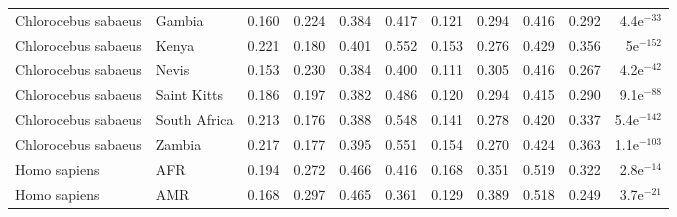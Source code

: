 \begin{longtable}{llrrrrrrrrr}
 Chlorocebus sabaeus &                    Gambia &                              0.160 &                               0.224 &                 0.384 &                 0.417 &                              0.121 &                               0.294 &                 0.416 &                 0.292 &  4.4e$^{-33}$ \\
 Chlorocebus sabaeus &                     Kenya &                              0.221 &                               0.180 &                 0.401 &                 0.552 &                              0.153 &                               0.276 &                 0.429 &                 0.356 &   5e$^{-152}$ \\
 Chlorocebus sabaeus &                     Nevis &                              0.153 &                               0.230 &                 0.384 &                 0.400 &                              0.111 &                               0.305 &                 0.416 &                 0.267 &  4.2e$^{-42}$ \\
 Chlorocebus sabaeus &               Saint Kitts &                              0.186 &                               0.197 &                 0.382 &                 0.486 &                              0.120 &                               0.294 &                 0.415 &                 0.290 &  9.1e$^{-88}$ \\
 Chlorocebus sabaeus &              South Africa &                              0.213 &                               0.176 &                 0.388 &                 0.548 &                              0.141 &                               0.278 &                 0.420 &                 0.337 & 5.4e$^{-142}$ \\
 Chlorocebus sabaeus &                    Zambia &                              0.217 &                               0.177 &                 0.395 &                 0.551 &                              0.154 &                               0.270 &                 0.424 &                 0.363 & 1.1e$^{-103}$ \\
        Homo sapiens &                       AFR &                              0.194 &                               0.272 &                 0.466 &                 0.416 &                              0.168 &                               0.351 &                 0.519 &                 0.322 &  2.8e$^{-14}$ \\
        Homo sapiens &                       AMR &                              0.168 &                               0.297 &                 0.465 &                 0.361 &                              0.129 &                               0.389 &                 0.518 &                 0.249 &  3.7e$^{-21}$ \\

\end{longtable}
